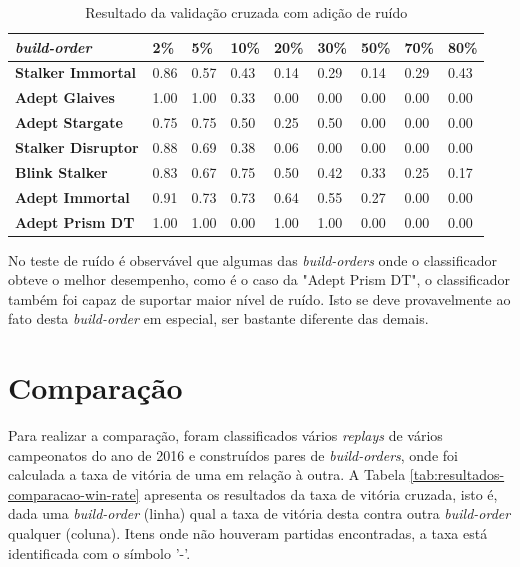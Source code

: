 \begin{table}[H]
\centering
\caption{Resultado da validação cruzada com adição de ruído}
\label{tab:resultados-cruzada}
\begin{tabular}{lllllllll}
\toprule
	\textit{\Gls{build-order}} 		& 2\%  & 5\%  & 10\% & 20\% & 30\% & 50\% & 70\% & 80\% \\ \hline
	\textbf{Stalker Immortal} 	& 0.86 & 0.57 & 0.43 & 0.14 & 0.29 & 0.14 & 0.29 & 0.43 \\
	\textbf{Adept Glaives} 		& 1.00 & 1.00 & 0.33 & 0.00 & 0.00 & 0.00 & 0.00 & 0.00 \\
	\textbf{Adept Stargate} 		& 0.75 & 0.75 & 0.50 & 0.25 & 0.50 & 0.00 & 0.00 & 0.00 \\
	\textbf{Stalker Disruptor} 	& 0.88 & 0.69 & 0.38 & 0.06 & 0.00 & 0.00 & 0.00 & 0.00 \\
	\textbf{Blink Stalker} 		& 0.83 & 0.67 & 0.75 & 0.50 & 0.42 & 0.33 & 0.25 & 0.17 \\
	\textbf{Adept Immortal} 		& 0.91 & 0.73 & 0.73 & 0.64 & 0.55 & 0.27 & 0.00 & 0.00 \\
	\textbf{Adept Prism DT} 		& 1.00 & 1.00 & 0.00 & 1.00 & 1.00 & 0.00 & 0.00 & 0.00 \\
\bottomrule
\end{tabular}
\end{table}

No teste de ruído é observável que algumas das \textit{\glspl{build-order}} onde o classificador obteve o melhor desempenho, como é o caso da "Adept Prism DT", o classificador também foi capaz de suportar maior nível de ruído. Isto se deve provavelmente ao fato desta \textit{\gls{build-order}} em especial, ser bastante diferente das demais.

		\section{Comparação}

Para realizar a comparação, foram classificados vários \textit{\glspl{replay}} de vários campeonatos do ano de 2016 e construídos pares de \textit{\glspl{build-order}}, onde foi calculada a taxa de vitória de uma em relação à outra. A Tabela \ref{tab:resultados-comparacao-win-rate} apresenta os resultados da taxa de vitória cruzada, isto é, dada uma \textit{\gls{build-order}} (linha) qual a taxa de vitória desta contra outra \textit{\gls{build-order}} qualquer (coluna). Itens onde não houveram partidas encontradas, a taxa está identificada com o símbolo '-'.

